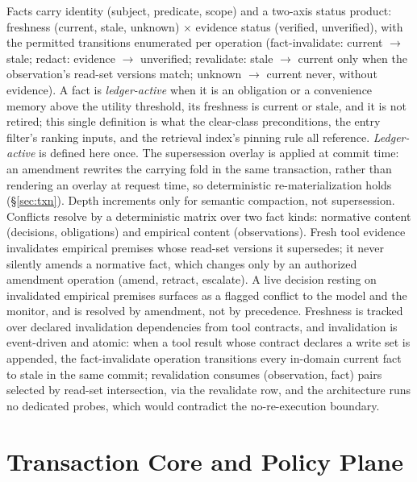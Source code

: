 \documentclass[11pt]{article}
\begin{document}
Facts carry identity (subject, predicate, scope) and a two-axis status product: freshness (current, stale, unknown) $\times$ evidence status (verified, unverified), with the permitted transitions enumerated per operation (fact-invalidate: current $\to$ stale; redact: evidence $\to$ unverified; revalidate: stale $\to$ current only when the observation's read-set versions match; unknown $\to$ current never, without evidence). A fact is \emph{ledger-active} when it is an obligation or a convenience memory above the utility threshold, its freshness is current or stale, and it is not retired; this single definition is what the clear-class preconditions, the entry filter's ranking inputs, and the retrieval index's pinning rule all reference. \emph{Ledger-active} is defined here once. The supersession overlay is applied at commit time: an amendment rewrites the carrying fold in the same transaction, rather than rendering an overlay at request time, so deterministic re-materialization holds (\S\ref{sec:txn}). Depth increments only for semantic compaction, not supersession. Conflicts resolve by a deterministic matrix over two fact kinds: normative content (decisions, obligations) and empirical content (observations). Fresh tool evidence invalidates empirical premises whose read-set versions it supersedes; it never silently amends a normative fact, which changes only by an authorized amendment operation (amend, retract, escalate). A live decision resting on invalidated empirical premises surfaces as a flagged conflict to the model and the monitor, and is resolved by amendment, not by precedence. Freshness is tracked over declared invalidation dependencies from tool contracts, and invalidation is event-driven and atomic: when a tool result whose contract declares a write set is appended, the fact-invalidate operation transitions every in-domain current fact to stale in the same commit; revalidation consumes (observation, fact) pairs selected by read-set intersection, via the revalidate row, and the architecture runs no dedicated probes, which would contradict the no-re-execution boundary.

\section{Transaction Core and Policy Plane}
\end{document}
